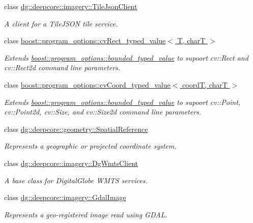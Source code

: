 \begin{DoxyCompactItemize}
class \hyperlink{classdg_1_1deepcore_1_1imagery_1_1_tile_json_client}{dg\+::deepcore\+::imagery\+::\+Tile\+Json\+Client}
\begin{DoxyCompactList}\small\item\em A client for a Tile\+J\+S\+ON tile service. \end{DoxyCompactList}\item 
class \hyperlink{structboost_1_1program__options_1_1cv_rect__typed__value}{boost\+::program\+\_\+options\+::cv\+Rect\+\_\+typed\+\_\+value$<$ T, char\+T $>$}
\begin{DoxyCompactList}\small\item\em Extends \hyperlink{classboost_1_1program__options_1_1bounded__typed__value}{boost\+::program\+\_\+options\+::bounded\+\_\+typed\+\_\+value} to supoort cv\+::\+Rect and cv\+::\+Rect2d command line parameters. \end{DoxyCompactList}\item 
class \hyperlink{structboost_1_1program__options_1_1cv_coord__typed__value}{boost\+::program\+\_\+options\+::cv\+Coord\+\_\+typed\+\_\+value$<$ coord\+T, char\+T $>$}
\begin{DoxyCompactList}\small\item\em Extends \hyperlink{classboost_1_1program__options_1_1bounded__typed__value}{boost\+::program\+\_\+options\+::bounded\+\_\+typed\+\_\+value} to supoort cv\+::\+Point, cv\+::\+Point2d, cv\+::\+Size, and cv\+::\+Size2d command line parameters. \end{DoxyCompactList}\item 
class \hyperlink{classdg_1_1deepcore_1_1geometry_1_1_spatial_reference}{dg\+::deepcore\+::geometry\+::\+Spatial\+Reference}
\begin{DoxyCompactList}\small\item\em Represents a geographic or projected coordinate system. \end{DoxyCompactList}\item 
class \hyperlink{classdg_1_1deepcore_1_1imagery_1_1_dg_wmts_client}{dg\+::deepcore\+::imagery\+::\+Dg\+Wmts\+Client}
\begin{DoxyCompactList}\small\item\em A base class for Digital\+Globe W\+M\+TS services. \end{DoxyCompactList}\item 
class \hyperlink{classdg_1_1deepcore_1_1imagery_1_1_gdal_image}{dg\+::deepcore\+::imagery\+::\+Gdal\+Image}
\begin{DoxyCompactList}\small\item\em Represents a geo-\/registered image read using G\+D\+AL. \end{DoxyCompactList}\item 

\end{DoxyCompactItemize}
